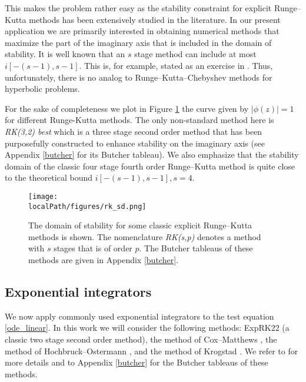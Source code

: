 This makes the problem rather easy as the stability constraint for explicit Runge--Kutta methods has been extensively studied in the literature. In our present application we are primarily interested in obtaining numerical methods that maximize the part of the imaginary axis that is included in the domain of stability. It is well known that an $s$ stage method can include at most $i [-(s-1),s-1]$. This is, for example, stated as an exercise in \cite[Chapter. IV.2, exercise 3]{Hairer:1996}. Thus, unfortunately, there is no analog to Runge--Kutta--Chebyshev methods for hyperbolic problems.

For the sake of completeness we plot in Figure \ref{fig:RK_sd2} the curve given by $|\phi(z)| = 1$ for different Runge-Kutta methods. The only non-standard method here is \textit{RK(3,2) best} which is a three stage second order method that has been purposefully constructed to enhance stability on the imaginary axis (see Appendix \ref{butcher} for its Butcher tableau). We also emphasize that the stability domain of the classic four stage fourth order Runge--Kutta method is quite close to the theoretical bound $i [-(s-1),s-1], s=4$.

\begin{figure}[h]
	\centering
	\texttt{[image: \\localPath/figures/rk\_sd.png]}
    \caption{The domain of stability for some classic explicit Runge--Kutta methods is shown. The nomenclature \textit{RK(s,p)} denotes a method with $s$ stages that is of order $p$. The Butcher tableaus of these methods are given in Appendix \ref{butcher}.
    }
	\label{fig:RK_sd2}
\end{figure}




\subsection{Exponential integrators}

We now apply commonly used exponential integrators to the test equation \eqref{ode_linear}. In this work we will consider the following methods: ExpRK22 (a classic two stage second order method), the method of Cox--Matthews \cite{Cox:2002}, the method of Hochbruck--Ostermann  \cite{Hochbruck:2005}, and the method of Krogstad \cite{Krogstad:2005}. We refer to \cite{Hochbruck:2010} for more details and to Appendix \ref{butcher} for the Butcher tableaus of these methods. 

